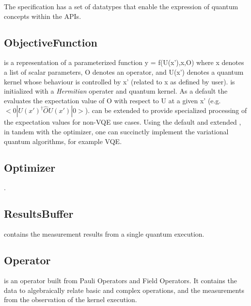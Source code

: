 The \qcor specification has a set of datatypes that enable the expression of quantum concepts within the \qcor \ac{API}s.\\

\subsection{\textbf{ObjectiveFunction}}\label{subsec:ObjectiveFunction}
 is a representation of a parameterized function y = f(U(x'),x,O)
where x denotes a list of scalar parameters, O denotes an operator, and U(x') denotes a quantum kernel whose behaviour is controlled by x' (related to x as defined by user).  is initialized with a {\em Hermitian} operater and quantum kernel. As a default the  evaluates the expectation value of O with respect to U at a given x' (e.g. $<0|U(x')^\dagger \hat{O} U(x')|0>$).  can be extended to provide specialized processing of the expectation values for non-VQE use cases. Using the default and extended , in tandem with the optimizer, one can succinctly implement the variational quantum algorithms, for example VQE.  

\subsection{\textbf{Optimizer}}\label{subsec:Optimizer}
 .\\


\subsection{\textbf{ResultsBuffer}}\label{subsec:ResultsBuffer}
 contains the measurement results from a single quantum execution.\\

\subsection{\textbf{Operator}}\label{subsec:Operator}
 is an operator built from Pauli Operators and Field Operators.
It contains the data to algebraically relate basic and complex operations, 
and the measurements from the observation of the kernel execution.\\

